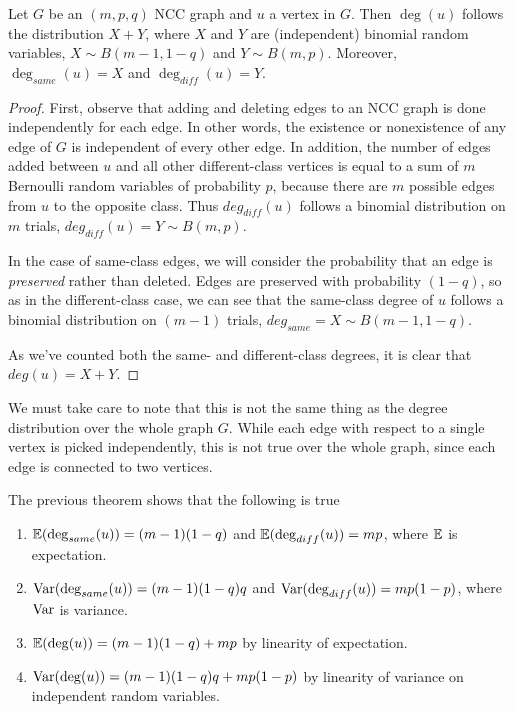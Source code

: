 \begin{theorem}
  \label{thm:ncc_deg}
  Let $G$ be an $(m,p,q)$ NCC graph and $u$ a vertex in $G$. Then $\deg(u)$ follows the distribution
  $X + Y$, where $X$ and $Y$ are (independent) binomial random variables, $X \sim B(m-1,1-q)$ and
  $Y \sim B(m,p)$. Moreover, $\deg_{same}(u) = X$ and $\deg_{diff}(u) = Y$.
\end{theorem}
\begin{proof}
  First, observe that adding and deleting edges to an NCC graph is done independently for each edge.
  In other words, the existence or nonexistence of any edge of $G$ is independent of every other edge.
  In addition, the number of edges added between $u$ and all other different-class vertices is equal
  to a sum of $m$ Bernoulli random variables of probability $p$, because there are $m$ possible edges
  from $u$ to the opposite class. Thus $deg_{diff}(u)$ follows a binomial distribution on $m$ trials,
  $deg_{diff}(u) = Y \sim B(m,p)$.

  In the case of same-class edges, we will consider the probability that an edge is \textit{preserved}
  rather than deleted. Edges are preserved with probability $(1-q)$, so as in the different-class
  case, we can see that the same-class degree of $u$ follows a binomial distribution on $(m-1)$
  trials, $deg_{same} = X \sim B(m-1,1-q)$.

  As we've counted both the same- and different-class degrees, it is clear that $deg(u) = X + Y$.
\end{proof}

We must take care to note that this is not the same thing as the degree distribution over the whole
graph $G$. While each edge with respect to a single vertex is picked independently, this is not true
over the whole graph, since each edge is connected to two vertices.

\begin{remark}
  The previous theorem shows that the following is true
  \begin{enumerate}
  \item $\mathbb{E}(\deg_{same}(u)) = (m-1)(1-q)$ and $\mathbb{E}(\deg_{diff}(u)) = mp$, where $\mathbb{E}$ is expectation.
  \item $\mathrm{Var}(\deg_{same}(u)) = (m-1)(1-q)q$ and $\mathrm{Var}(\deg_{diff}(u)) = mp(1-p)$, where $\mathrm{Var}$ is
    variance.
  \item $\mathbb{E}(\deg(u)) = (m-1)(1-q) + mp$ by linearity of expectation.
  \item $\mathrm{Var}(\deg(u)) = (m-1)(1-q)q + mp(1-p)$ by linearity of variance on independent random
    variables.
  \end{enumerate}
\end{remark}


